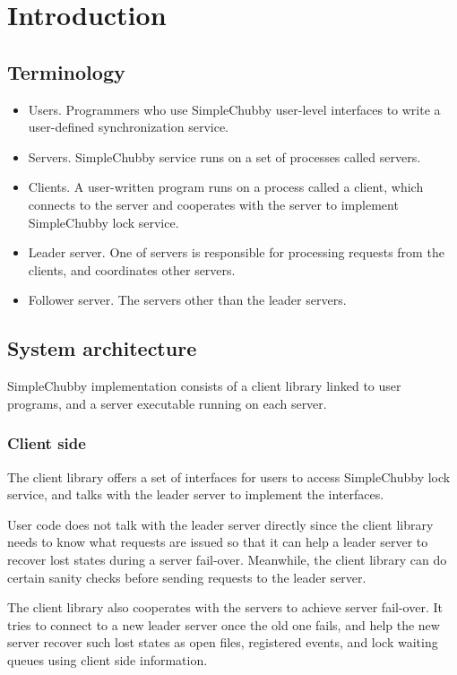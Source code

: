 \section{Introduction}

\subsection{Terminology}

\begin{itemize}[noitemsep]
  \item Users.
  Programmers who use SimpleChubby user-level interfaces to write a user-defined synchronization service.
  \item Servers.
  SimpleChubby service runs on a set of processes called servers.
  \item Clients.
  A user-written program runs on a process called a client, which connects to the server
  and cooperates with the server to implement SimpleChubby lock service.
  \item Leader server.
  One of servers is responsible for processing requests from the clients, and coordinates other servers.
  \item Follower server.
  The servers other than the leader servers.
\end{itemize}

\subsection{System architecture}

SimpleChubby implementation consists of a client library linked to user programs,
and a server executable running on each server.

\subsubsection{Client side}
The client library offers a set of interfaces for users to access SimpleChubby lock service,
and talks with the leader server to implement the interfaces. 

User code does not talk with the leader server directly since the client library
needs to know what requests are issued so that it can help a leader server
to recover lost states during a server fail-over.
Meanwhile, the client library can do certain sanity checks before sending requests
to the leader server.

The client library also cooperates with the servers to achieve server fail-over.  
It tries to connect to a new leader server once the old one fails,
and help the new server recover such lost states
as open files, registered events, and lock waiting queues
using client side information.

